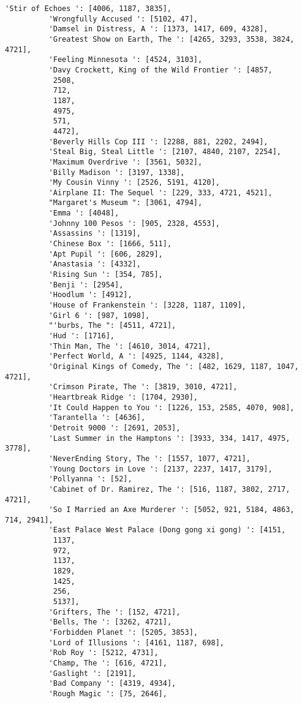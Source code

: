\documentclass[11pt]{article}
\begin{document}
\begin{Verbatim}[commandchars=\\\{\}]
          'Stir of Echoes ': [4006, 1187, 3835],
          'Wrongfully Accused ': [5102, 47],
          'Damsel in Distress, A ': [1373, 1417, 609, 4328],
          'Greatest Show on Earth, The ': [4265, 3293, 3538, 3824, 4721],
          'Feeling Minnesota ': [4524, 3103],
          'Davy Crockett, King of the Wild Frontier ': [4857,
           2508,
           712,
           1187,
           4975,
           571,
           4472],
          'Beverly Hills Cop III ': [2288, 881, 2202, 2494],
          'Steal Big, Steal Little ': [2107, 4840, 2107, 2254],
          'Maximum Overdrive ': [3561, 5032],
          'Billy Madison ': [3197, 1338],
          'My Cousin Vinny ': [2526, 5191, 4120],
          'Airplane II: The Sequel ': [229, 333, 4721, 4521],
          "Margaret's Museum ": [3061, 4794],
          'Emma ': [4048],
          'Johnny 100 Pesos ': [905, 2328, 4553],
          'Assassins ': [1319],
          'Chinese Box ': [1666, 511],
          'Apt Pupil ': [606, 2829],
          'Anastasia ': [4332],
          'Rising Sun ': [354, 785],
          'Benji ': [2954],
          'Hoodlum ': [4912],
          'House of Frankenstein ': [3228, 1187, 1109],
          'Girl 6 ': [987, 1098],
          "'burbs, The ": [4511, 4721],
          'Hud ': [1716],
          'Thin Man, The ': [4610, 3014, 4721],
          'Perfect World, A ': [4925, 1144, 4328],
          'Original Kings of Comedy, The ': [482, 1629, 1187, 1047, 4721],
          'Crimson Pirate, The ': [3819, 3010, 4721],
          'Heartbreak Ridge ': [1704, 2930],
          'It Could Happen to You ': [1226, 153, 2585, 4070, 908],
          'Tarantella ': [4636],
          'Detroit 9000 ': [2691, 2053],
          'Last Summer in the Hamptons ': [3933, 334, 1417, 4975, 3778],
          'NeverEnding Story, The ': [1557, 1077, 4721],
          'Young Doctors in Love ': [2137, 2237, 1417, 3179],
          'Pollyanna ': [52],
          'Cabinet of Dr. Ramirez, The ': [516, 1187, 3802, 2717, 4721],
          'So I Married an Axe Murderer ': [5052, 921, 5184, 4863, 714, 2941],
          'East Palace West Palace (Dong gong xi gong) ': [4151,
           1137,
           972,
           1137,
           1829,
           1425,
           256,
           5137],
          'Grifters, The ': [152, 4721],
          'Bells, The ': [3262, 4721],
          'Forbidden Planet ': [5205, 3853],
          'Lord of Illusions ': [4161, 1187, 698],
          'Rob Roy ': [5212, 4731],
          'Champ, The ': [616, 4721],
          'Gaslight ': [2191],
          'Bad Company ': [4319, 4934],
          'Rough Magic ': [75, 2646],

\end{Verbatim}
\end{document}
